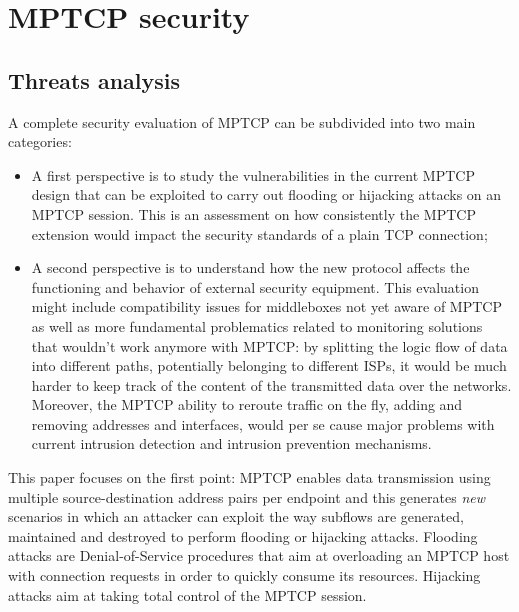 \chapter{MPTCP security}
\label{chap:mptcpsecurity}

\section{Threats analysis}
A complete security evaluation of MPTCP can be subdivided into two main categories:

\begin{itemize}
  \item A first perspective is to study the vulnerabilities in the current MPTCP design that can be exploited to carry out flooding or hijacking attacks on an MPTCP session. This is an assessment on how consistently the MPTCP extension would impact the security standards of a plain TCP connection;
  \item A second perspective is to understand how the new protocol affects the functioning and behavior of external security equipment. This evaluation might include compatibility issues for middleboxes not yet aware of MPTCP as well as more fundamental problematics related to monitoring solutions that wouldn't work anymore with MPTCP: by splitting the logic flow of data into different paths, potentially belonging to different ISPs, it would be much harder to keep track of the content of the transmitted data over the networks. Moreover, the MPTCP ability to reroute traffic on the fly, adding and removing addresses and interfaces, would per se cause major problems with current intrusion detection and intrusion prevention mechanisms.
\end{itemize}

This paper focuses on the first point: MPTCP enables data transmission using multiple source-destination address pairs per endpoint and this generates \textit{new} scenarios in which an attacker can exploit the way subflows are generated, maintained and destroyed to perform flooding or hijacking attacks. 
Flooding attacks are Denial-of-Service procedures that aim at overloading an MPTCP host with connection requests in order to quickly consume its resources.
Hijacking attacks aim at taking total control of the MPTCP session.

